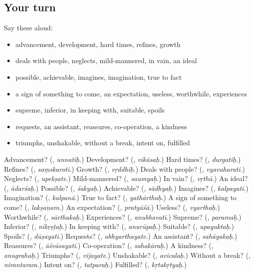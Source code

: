 \subsection*{Your turn}
Say these aloud:

\begin{itemize}
\raggedright
  \item advancement, development, hard times, refines, growth
  \item deals with people, neglects, mild-mannered, in vain, an ideal
  \item possible, achievable, imagines, imagination, true to fact
  \item a sign of something to come, an expectation, useless, worthwhile, experiences
  \item supreme, inferior, in keeping with, suitable, spoils
  \item requests, an assistant, reassures, co-operation, a kindness
  \item triumphs, unshakable, without a break, intent on, fulfilled
\end{itemize}

\begin{tcolorbox}[breakable,colback=teal!4,colframe=teal!35!black,title={Before you move on}]
Advancement? (\textbf{}, \emph{unnatiḥ}.) Development? (\textbf{}, \emph{vikāsaḥ}.) Hard times? (\textbf{}, \emph{durgatiḥ}.) Refines? (\textbf{}, \emph{saṃskaroti}.) Growth? (\textbf{}, \emph{vṛddhiḥ}.) Deals with people? (\textbf{}, \emph{vyavaharati}.) Neglects? (\textbf{}, \emph{upekṣate}.) Mild-mannered? (\textbf{}, \emph{saumyaḥ}.) In vain? (\textbf{}, \emph{vṛthā}.) An ideal? (\textbf{}, \emph{ādarśaḥ}.) Possible? (\textbf{}, \emph{śakyaḥ}.) Achievable? (\textbf{}, \emph{sādhyaḥ}.) Imagines? (\textbf{}, \emph{kalpayati}.) Imagination? (\textbf{}, \emph{kalpanā}.) True to fact? (\textbf{}, \emph{yathārthaḥ}.) A sign of something to come? (\textbf{}, \emph{lakṣaṇam}.) An expectation? (\textbf{}, \emph{pratyāśā}.) Useless? (\textbf{}, \emph{vyarthaḥ}.) Worthwhile? (\textbf{}, \emph{sārthakaḥ}.) Experiences? (\textbf{}, \emph{anubhavati}.) Supreme? (\textbf{}, \emph{paramaḥ}.) Inferior? (\textbf{}, \emph{nikṛṣṭaḥ}.) In keeping with? (\textbf{}, \emph{anurūpaḥ}.) Suitable? (\textbf{}, \emph{upayuktaḥ}.) Spoils? (\textbf{}, \emph{dūṣayati}.) Requests? (\textbf{}, \emph{abhyarthayate}.) An assistant? (\textbf{}, \emph{sahāyakaḥ}.) Reassures? (\textbf{}, \emph{āśvāsayati}.) Co-operation? (\textbf{}, \emph{sahakāraḥ}.) A kindness? (\textbf{}, \emph{anugrahaḥ}.) Triumphs? (\textbf{}, \emph{vijayate}.) Unshakable? (\textbf{}, \emph{avicalaḥ}.) Without a break? (\textbf{}, \emph{nirantaram}.) Intent on? (\textbf{}, \emph{tatparaḥ}.) Fulfilled? (\textbf{}, \emph{kṛtakṛtyaḥ}.)
\end{tcolorbox}
